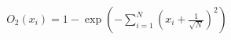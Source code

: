 \documentclass[10pt]{article}
\begin{document}
\begin{align*}O_{2}\left(x_{i}\right) = 1 - \exp\left(-\sum_{i=1}^{N}\left(x_{i}+\frac{1}{\sqrt{N}}\right)^2\right)\end{align*}
\end{document}
